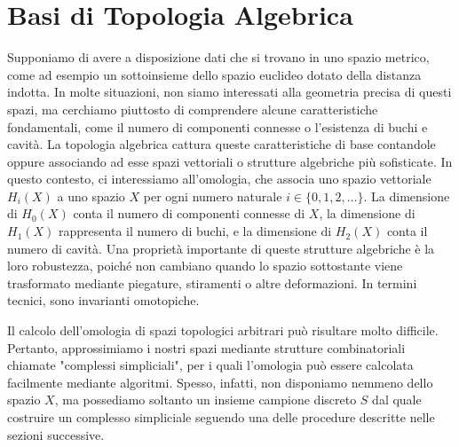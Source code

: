 \documentclass[a4paper, 12pt]{article}
\theoremstyle{definition}
\theoremstyle{remark}
\begin{document}
\section{Basi di Topologia Algebrica}\label{sec:topologia-algebrica}
Supponiamo di avere a disposizione dati che si trovano in uno spazio metrico, come ad esempio un sottoinsieme dello spazio euclideo dotato della distanza indotta. In molte situazioni, non siamo interessati alla geometria precisa di questi spazi, ma cerchiamo piuttosto di comprendere alcune caratteristiche fondamentali, come il numero di componenti connesse o l'esistenza di buchi e cavità. La topologia algebrica cattura queste caratteristiche di base contandole oppure associando ad esse spazi vettoriali o strutture algebriche più sofisticate. In questo contesto, ci interessiamo all'omologia, che associa uno spazio vettoriale $H_i(X)$ a uno spazio $X$ per ogni numero naturale $i \in \{0, 1, 2, \ldots\}$. La dimensione di $H_0(X)$ conta il numero di componenti connesse di $X$, la dimensione di $H_1(X)$ rappresenta il numero di buchi, e la dimensione di $H_2(X)$ conta il numero di cavità. Una proprietà importante di queste strutture algebriche è la loro robustezza, poiché non cambiano quando lo spazio sottostante viene trasformato mediante piegature, stiramenti o altre deformazioni. In termini tecnici, sono invarianti omotopiche.

Il calcolo dell'omologia di spazi topologici arbitrari può risultare molto difficile. Pertanto, approssimiamo i nostri spazi mediante strutture combinatoriali chiamate "complessi simpliciali", per i quali l'omologia può essere calcolata facilmente mediante algoritmi. Spesso, infatti, non disponiamo nemmeno dello spazio $X$, ma possediamo soltanto un insieme campione discreto $S$ dal quale costruire un complesso simpliciale seguendo una delle procedure descritte nelle sezioni successive.


\end{document}
